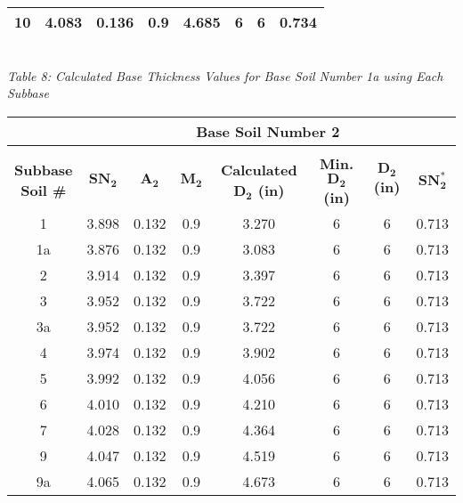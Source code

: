 \documentclass{article}
\begin{document}
\begin{center}
\begin{spacing}{1.6}
\begin{tabular}{|c|ccccccc|}
                                            10 & 4.083 & 0.136 & 0.9 & 4.685 & 6 & 6 & 0.734 \\\hline
        \end{tabular}
        \vspace{3mm}
        \emph{\\Table 8: Calculated Base Thickness Values for Base Soil Number 1a using Each Subbase}
        \begin{tabular}{|c|ccccccc|}
            \hline    
            \multicolumn{1}{|l}{}                     & \multicolumn{7}{c|}{\textbf{Base Soil Number 2}}                                              \\\hline
            &&&&&&&\\
             \shortstack[c]{\textbf{Subbase}\\\textbf{Soil \#}} & $\bm{SN_2}$ & $\bm{A_2}$ & $\bm{M_2}$ & \textbf{Calculated $\bm{D_2}$ (in)} & \textbf{Min. $\bm{D_2}$ (in)} & \textbf{$\bm{D_2}$ (in)} & $\bm{SN_2^*}$  \\\hline
                                            1  & 3.898 & 0.132 & 0.9 & 3.270 & 6 & 6 & 0.713  \\
                                            1a & 3.876 & 0.132 & 0.9 & 3.083 & 6 & 6 & 0.713  \\
                                            2  & 3.914 & 0.132 & 0.9 & 3.397 & 6 & 6 & 0.713  \\
                                            3  & 3.952 & 0.132 & 0.9 & 3.722 & 6 & 6 & 0.713  \\
                                            3a & 3.952 & 0.132 & 0.9 & 3.722 & 6 & 6 & 0.713  \\
                                            4  & 3.974 & 0.132 & 0.9 & 3.902 & 6 & 6 & 0.713  \\
                                            5  & 3.992 & 0.132 & 0.9 & 4.056 & 6 & 6 & 0.713  \\
                                            6  & 4.010 & 0.132 & 0.9 & 4.210 & 6 & 6 & 0.713  \\
                                            7  & 4.028 & 0.132 & 0.9 & 4.364 & 6 & 6 & 0.713  \\
                                            9  & 4.047 & 0.132 & 0.9 & 4.519 & 6 & 6 & 0.713  \\
                                            9a & 4.065 & 0.132 & 0.9 & 4.673 & 6 & 6 & 0.713  \\

\end{tabular}
\end{spacing}
\end{center}
\end{document}
